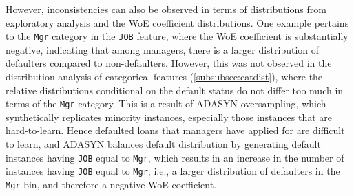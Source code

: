  However, inconsistencies can also be observed in terms of distributions from exploratory analysis and the WoE coefficient distributions.
 One example pertains to the \texttt{Mgr} category in the \texttt{JOB} feature, where the WoE coefficient is substantially negative, indicating that among managers, there is a larger distribution of defaulters compared to non-defaulters.
 However, this was not observed in the distribution analysis of categorical features (\autoref{subsubsec:catdist}), where the relative distributions conditional on the default status do not differ too much in terms of the \texttt{Mgr} category.
 This is a result of ADASYN oversampling, which synthetically replicates minority instances, especially those instances that are hard-to-learn.
 Hence defaulted loans that managers have applied for are difficult to learn, and ADASYN balances default distribution by generating default instances having \texttt{JOB} equal to \texttt{Mgr}, which results in an increase in the number of instances having \texttt{JOB} equal to \texttt{Mgr}, i.e., a larger distribution of defaulters in the \texttt{Mgr} bin, and therefore a negative WoE coefficient.

